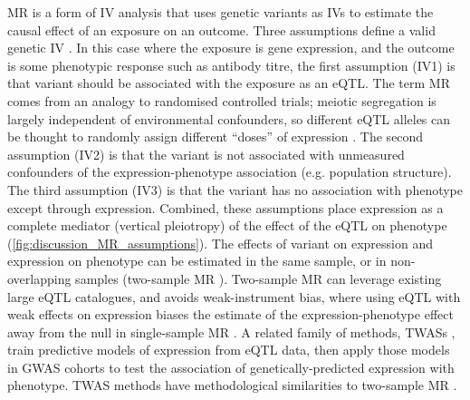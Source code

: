 \gls{MR} is a form of \gls{IV} analysis that uses genetic variants as \glspl{IV} to estimate the causal effect of an exposure on an outcome.
Three assumptions define a valid genetic \gls{IV} \autocite{daveysmith2014MendelianRandomizationGenetic,hemani2018EvaluatingPotentialRole,neumeyer2020StrengtheningCausalInference}.
In this case where the exposure is gene expression, and the outcome is some phenotypic response such as antibody titre,
the first assumption (IV1) is that variant should be associated with the exposure as an \gls{eQTL}.
The term \gls{MR} comes from an analogy to randomised controlled trials;
meiotic segregation is largely independent of environmental confounders, 
so different \gls{eQTL} alleles can be thought to randomly assign different \enquote{doses} of expression \autocite{daveysmith2014MendelianRandomizationGenetic}.
The second assumption (IV2) is that the variant is not associated with unmeasured confounders of the expression-phenotype association (e.g. population structure).
The third assumption (IV3) is that the variant has no association with phenotype except through expression. 
Combined, these assumptions place expression as a complete mediator (vertical pleiotropy) of the effect of the \gls{eQTL} on phenotype (\cref{fig:discussion_MR_assumptions}).
The effects of variant on expression and expression on phenotype can be estimated in the same sample, 
or in non-overlapping samples (two-sample \gls{MR} \autocite{hemani2018EvaluatingPotentialRole,neumeyer2020StrengtheningCausalInference}).
Two-sample \gls{MR} can leverage existing large \gls{eQTL} catalogues,
and avoids weak-instrument bias, where using \gls{eQTL} with weak effects on expression biases the estimate of the expression-phenotype effect away from the null in single-sample \gls{MR} \autocite{daveysmith2020MendelLawsMendelian}.
%
A related family of methods,
\glspl{TWAS} \autocite{gusev2016IntegrativeApproachesLargescale},
train predictive models of expression from \gls{eQTL} data, 
then apply those models in \gls{GWAS} cohorts to test the association of genetically-predicted expression with phenotype.
\gls{TWAS} methods have methodological similarities to two-sample \gls{MR} \autocite{zhu2020TranscriptomewideAssociationStudies}.

